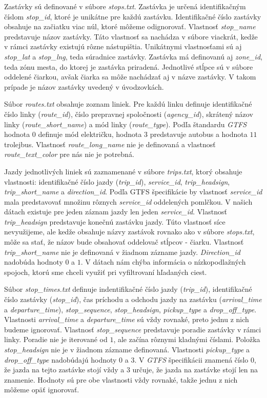 Zastávky sú definované v súbore \textit{stops.txt}. Zastávka je určená identifikačným číslom \textit{stop\_id}, ktoré je unikátne pre každú zastávku. Identifikačné číslo zastávky obsahuje na začiatku viac núl, ktoré môžeme odignorovať. Vlastnosť \textit{stop\_name} predstavuje názov zastávky. Táto vlastnosť sa nachádza v súbore viackrát, kedže v rámci zastávky existujú rôzne nástupištia. Unikátnymi vlastnosťami sú aj \textit{stop\_lat} a \textit{stop\_lng}, teda súradnice zastávky. Zastávka má definovanú aj \textit{zone\_id}, teda zónu mesta, do ktorej je zastávka priradená. Jednotlivé stĺpce sú v súbore oddelené čiarkou, avšak čiarka sa môže nachádzať aj v názve zastávky. V takom prípade je názov zastávky uvedený v úvodzovkách.

Súbor \textit{routes.txt} obsahuje zoznam liniek. Pre každú linku definuje identifikačné číslo linky (\textit{route\_id}), číslo prepravnej spoločnosti (\textit{agency\_id}), skrátený názov linky (\textit{route\_short\_name}) a mód linky (\textit{route\_type}). Podľa štandardu \textit{GTFS} hodnota $0$ definuje mód električku, hodnota $3$ predstavuje autobus a hodnota $11$ trolejbus. Vlastnosť \textit{route\_long\_name} nie je definovaná a vlastnosť \textit{route\_text\_color} pre nás nie je potrebná.

Jazdy jednotlivých liniek sú zaznamenané v súbore \textit{trips.txt}, ktorý obsahuje vlastnosti: identifikačné číslo jazdy (\textit{trip\_id}), \textit{service\_id}, \textit{trip\_headsign}, \textit{trip\_short\_name} a \textit{direction\_id}. Podľa GTFS špecifikácie by vlastnosť \textit{service\_id} mala predstavovať množinu rôznych \textit{service\_id} oddelených pomlčkou. V našich dátach existuje pre jeden záznam jazdy len jeden \textit{service\_id}. Vlastnosť \textit{trip\_headsign} predstavuje konečnú zastávku jazdy. Túto vlastnosť síce nevyužijeme, ale kedže obsahuje názvy zastávok rovnako ako v súbore \textit{stops.txt}, môže sa stať, že názov bude obsahovať oddelovač stĺpcov - čiarku. Vlastnosť \textit{trip\_short\_name} nie je definovaná v žiadnom zázname jazdy. \textit{Direction\_id} nadobúda hodnoty $0$ a $1$. V dátach nám chýba informácia o nízkopodlažných spojoch, ktorú sme chceli využiť pri vyfiltrovaní hľadaných ciest.

Súbor \textit{stop\_times.txt} definuje indentifikačné číslo jazdy (\textit{trip\_id}), identifikačné číslo zastávky (\textit{stop\_id}), čas príchodu a odchodu jazdy na zastávku (\textit{arrival\_time} a \textit{departure\_time}), \textit{stop\_sequence}, \textit{stop\_headsign}, \textit{pickup\_type} a \textit{drop\_off\_type}. Vlastnosti \textit{arrival\_time} a \textit{departure\_time} sú vždy rovnaké, preto jednu z nich budeme ignorovať. Vlastnosť \textit{stop\_sequence} predstavuje poradie zastávky v rámci linky. Poradie nie je iterované od $1$, ale začína rôznymi kladnými číslami. Položka \textit{stop\_headsign} nie je v žiadnom zázname definovaná. Vlastnosti \textit{pickup\_type} a \textit{drop\_off\_type} nadobúdajú hodnoty $0$ a $3$. V \textit{GTFS} špecifikácii znamená číslo $0$, že jazda na tejto zastávke stojí vždy a $3$ určuje, že jazda na zastávke stojí len na znamenie. Hodnoty sú pre obe vlastnosti vždy rovnaké, takže jednu z nich môžeme opäť ignorovať.


